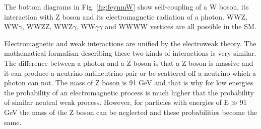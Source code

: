 The bottom diagrams in Fig. \ref{fig:feynmW} show self-coupling of a W boson, its interaction with Z boson and its electromagnetic radiation of a photon. WWZ, WW$\gamma$, WWZZ, WWZ$\gamma$, WW$\gamma\gamma$ and WWWW vertices are all possible in the SM.

Electromagnetic and weak interactions are unified by the electroweak theory. The mathematical formalism describing these two kinds of interactions is very similar. The difference between a photon and a Z boson is that a Z boson is massive and it can produce a neutrino-antineutrino pair or be scattered off a neutrino which a photon can not. The mass of Z boson is 91 GeV and that is why for low energies the probability of an electromagnetic process is much higher that the probability of similar neutral weak process. However, for particles with energies of E$\gg$91 GeV the mass of the Z boson can be neglected and these probabilities become the same. 
